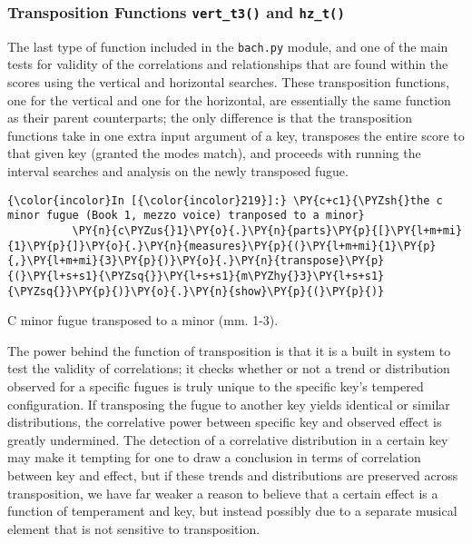 \subsubsection{\texorpdfstring{Transposition Functions
\texttt{vert\_t3()} and
\texttt{hz\_t()}}{Transposition Functions vert\_t3() and hz\_t()}}\label{transposition-functions-vert_t3-and-hz_t}

The last type of function included in the \texttt{bach.py} module, and
one of the main tests for validity of the correlations and relationships
that are found within the scores using the vertical and horizontal
searches. These transposition functions, one for the vertical and one
for the horizontal, are essentially the same function as their parent
counterparts; the only difference is that the transposition functions
take in one extra input argument of a key, transposes the entire score
to that given key (granted the modes match), and proceeds with running
the interval searches and analysis on the newly transposed fugue.


    \begin{Verbatim}[commandchars=\\\{\}]
{\color{incolor}In [{\color{incolor}219}]:} \PY{c+c1}{\PYZsh{}the c minor fugue (Book 1, mezzo voice) tranposed to a minor}
          \PY{n}{c\PYZus{}1}\PY{o}{.}\PY{n}{parts}\PY{p}{[}\PY{l+m+mi}{1}\PY{p}{]}\PY{o}{.}\PY{n}{measures}\PY{p}{(}\PY{l+m+mi}{1}\PY{p}{,}\PY{l+m+mi}{3}\PY{p}{)}\PY{o}{.}\PY{n}{transpose}\PY{p}{(}\PY{l+s+s1}{\PYZsq{}}\PY{l+s+s1}{m\PYZhy{}3}\PY{l+s+s1}{\PYZsq{}}\PY{p}{)}\PY{o}{.}\PY{n}{show}\PY{p}{(}\PY{p}{)}
\end{Verbatim}

\begin{Example}[H]
\vspace{1.5em}
    \centering
    \caption{ C minor fugue transposed to a minor (mm. 1-3). }
\end{Example}    
    The power behind the function of transposition is that it is a built in
system to test the validity of correlations; it checks whether or not a
trend or distribution observed for a specific fugues is truly unique to
the specific key's tempered configuration. If transposing the fugue to
another key yields identical or similar distributions, the correlative
power between specific key and observed effect is greatly undermined.
The detection of a correlative distribution in a certain key may make it
tempting for one to draw a conclusion in terms of correlation between
key and effect, but if these trends and distributions are preserved
across transposition, we have far weaker a reason to believe that a
certain effect is a function of temperament and key, but instead
possibly due to a separate musical element that is not sensitive to
transposition.

